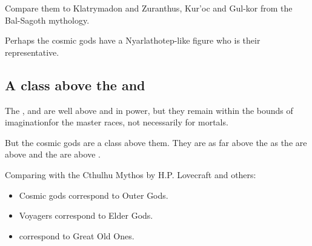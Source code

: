 Compare them to Klatrymadon and Zuranthus, Kur'oc and Gul-kor from the Bal-Sagoth mythology.


Perhaps the cosmic gods have a Nyarlathotep-like figure who is their representative. 









\subsection{A class above the \xss{} and \voyagers}
The \xss{}, \banelords{} and \voyagers{} are well above \dragons{} and \resphain{} in power, but they remain within the bounds of imagination\dash for the master races, not necessarily for mortals. 

But the cosmic gods are a class above them. They are as far above the \xss{} as the \xss{} are above \dragons{} and the \dragons{} are above \scathae. 

Comparing with the Cthulhu Mythos by H.P. Lovecraft and others:

\begin{itemize}
  \item Cosmic gods correspond to Outer Gods.
  \item Voyagers correspond to Elder Gods. 
  \item \XzaiShanns{} correspond to Great Old Ones. 
\end{itemize}








